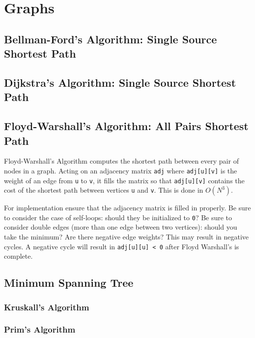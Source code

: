 \documentclass[letterpaper,11pt,twoside]{article}
\begin{document}
        \section{Graphs}
            \subsection{Bellman-Ford's Algorithm: Single Source Shortest Path}
                
            \subsection{Dijkstra's Algorithm: Single Source Shortest Path}
            \subsection{Floyd-Warshall's Algorithm: All Pairs Shortest Path}
                Floyd-Warshall's Algorithm computes the shortest path between every pair of nodes in a graph.
                Acting on an adjacency matrix \verb|adj| where \verb|adj[u][v]| is the weight of an edge from \verb|u| to \verb|v|, it fills the matrix so that \verb|adj[u][v]| contains the cost of the shortest path between vertices \verb|u| and \verb|v|.
                This is done in $O(N^{3})$.

                For implementation ensure that the adjacency matrix is filled in properly.
                Be sure to consider the case of self-loops: should they be initialized to \verb|0|?
                Be sure to consider double edges (more than one edge between two vertices): should you take the minimum?
                Are there negative edge weights?
                This may result in negative cycles.
                A negative cycle will result in \verb|adj[u][u] < 0| after Floyd Warshall's is complete.

                
                
            \subsection{Minimum Spanning Tree}
                \subsubsection{Kruskall's Algorithm}
                \subsubsection{Prim's Algorithm}
\end{document}
